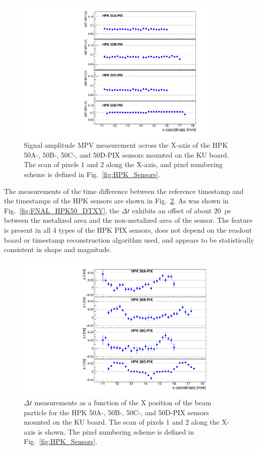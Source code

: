 \documentclass[preprint,1p]{elsarticle}
\begin{document}
\begin{figure}[htbp] 
\centering
\includegraphics[width=0.9\textwidth]{figs/KUBoard_HPK50ABCD/KUBoard_50ABCD_MPV.pdf} 
\caption{Signal amplitude MPV measurement across the X-axis of the HPK 50A-, 50B-, 50C-, and 50D-PIX sensors mounted on the KU board. The scan of pixels 1 and 2 along the X-axis, and pixel numbering scheme is defined in Fig.~\ref{fig:HPK_Sensors}.} 
\label{fig:KUBoard_50ABCD_MPV} 
\end{figure} 

The measurements of the time difference between the reference timestamp and the
timestamps of the HPK sensors are shown in
Fig.~\ref{fig:KUBoard_50ABCD_MeanTime}. As was shown in
Fig.~\ref{fig:FNAL_HPK50_DTXY}, the $\Delta t$ exhibits an offset of about
$20$~ps between the metalized area and the non-metalized area of the sensor. The
feature is present in all 4 types of the HPK PIX sensors, does not depend on the
readout board or timestamp reconstruction algorithm used, and appears to be
statistically consistent in shape and magnitude. 

\begin{figure}[htbp] 
\centering
\includegraphics[width=0.9\textwidth]{figs/KUBoard_HPK50ABCD/KUBoard_50ABCD_MeanTime.pdf} 
\caption{$\Delta t$ measurements as a function of the X position of the beam particle 
for the HPK 50A-, 50B-, 50C-, and 50D-PIX sensors mounted on the KU board. The scan 
of pixels 1 and 2 along the X-axis is shown. The pixel numbering scheme is defined 
in Fig.~\ref{fig:HPK_Sensors}.} 
\label{fig:KUBoard_50ABCD_MeanTime} 
\end{figure} 
\end{document}
